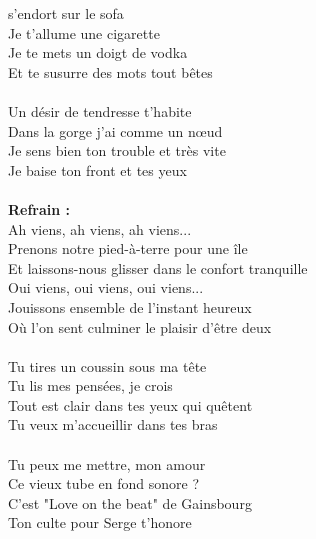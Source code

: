 
 s'endort sur le sofa
\\Je t'allume une cigarette
\\Je te mets un doigt de vodka
\\Et te susurre des mots tout bêtes
\\\\Un désir de tendresse t'habite
\\Dans la gorge j'ai comme un nœud
\\Je sens bien ton trouble et très vite
\\Je baise ton front et tes yeux
\\\\\textbf{Refrain :}
\\Ah viens, ah viens, ah viens...
\\Prenons notre pied-à-terre pour une île
\\Et laissons-nous glisser dans le confort tranquille
\\Oui viens, oui viens, oui viens...
\\Jouissons ensemble de l'instant heureux
\\Où l'on sent culminer le plaisir d'être deux
\\\\Tu tires un coussin sous ma tête
\\Tu lis mes pensées, je crois
\\Tout est clair dans tes yeux qui quêtent
\\Tu veux m'accueillir dans tes bras
\\\\Tu peux me mettre, mon amour
\\Ce vieux tube en fond sonore ?
\\C'est "Love on the beat" de Gainsbourg
\\Ton culte pour Serge t'honore

\breakpage
